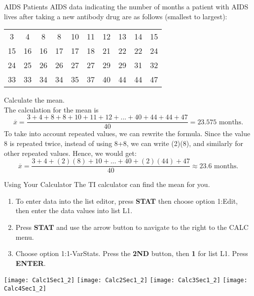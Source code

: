 \begin{example}[https://www.youtube.com/watch?v=CDkM8Hojqg0]{AIDS Patients}
AIDS data indicating the number of months a patient with AIDS lives after taking a new antibody drug are as follows (smallest to largest):
\begin{center}
\begin{tabular}{c c c c c c c c c c}
3 & 4 & 8 & 8 & 10 & 11 & 12 & 13 & 14 & 15\\
15 & 16 & 16 & 17 & 17 & 18 & 21 & 22 & 22 & 24\\
24 & 25 & 26 & 26 & 27 & 27 & 29 & 29 & 31 & 32\\
33 & 33 & 34 & 34 & 35 & 37 & 40 & 44 & 44 & 47\\
\end{tabular}
\end{center}
Calculate the mean.\\

The calculation for the mean is \[\overline{x} = \frac{3 + 4 + 8 + 8 + 10 + 11 + 12 +...+ 40 + 44 + 44 + 47}{40} = 23.575 \textrm{ months.}\]
To take into account repeated values, we can rewrite the formula. Since the value 8 is repeated twice, instead of using 8+8, we can write (2)(8), and similarly for other repeated values. Hence, we would get:\
\[\overline{x} = \frac{3 + 4 + (2)(8) + 10 + ... + 40 + (2)(44) + 47}{40} \approx 23.6 \textrm{ months.}\]
\end{example}
\vfill
\pagebreak

\begin{proc}{Using Your Calculator}
The TI calculator can find the mean for you.
\begin{enumerate}
\item To enter data into the list editor, press \textbf{STAT} then choose option 1:Edit, then enter the data values into list L1.
\item Press \textbf{STAT} and use the arrow button to navigate to the right to the CALC menu. 
\item Choose option 1:1-VarStats. Press the \textbf{2ND} button, then \textbf{1} for list L1. Press \textbf{ENTER}.
\end{enumerate}

\texttt{[image: Calc1Sec1\_2]}
\texttt{[image: Calc2Sec1\_2]}
\texttt{[image: Calc3Sec1\_2]}
\texttt{[image: Calc4Sec1\_2]}
\end{proc}

